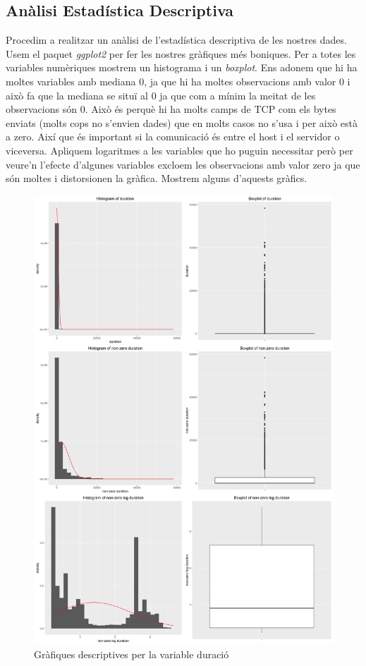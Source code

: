 \documentclass[a4paper]{article} %
\begin{document}
\subsection{Anàlisi Estadística Descriptiva}
Procedim a realitzar un anàlisi de l'estadística descriptiva de les nostres dades. Usem el paquet \textit{ggplot2}\cite{ggplot} per fer les nostres gràfiques més boniques. Per a totes les variables numèriques mostrem un histograma i un \textit{boxplot}. Ens adonem que hi ha moltes variables amb mediana 0, ja que hi ha moltes observacions amb valor 0 i això fa que la mediana se situï al 0 ja que com a mínim la meitat de les observacions són 0. Això és perquè hi ha molts camps de TCP com els bytes enviats (molts cops no s'envien dades) que en molts casos no s'usa i per això està a zero. Així que és important si la comunicació és entre el host i el servidor o viceversa. Apliquem logaritmes a les variables que ho puguin necessitar però per veure'n l'efecte d'algunes variables excloem les observacions amb valor zero ja que són moltes i distorsionen la gràfica. Mostrem alguns d'aquests gràfics.

\begin{figure}[H]
	\centering
	\includegraphics[scale=0.25]{duration.png}
	\caption{Gràfiques descriptives per la variable duració}
	\label{fig:duration}
\end{figure}
\end{document}
